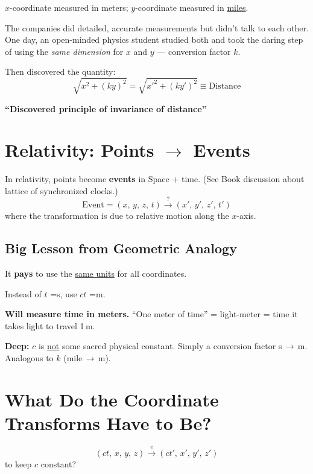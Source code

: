 $x$-coordinate measured in meters; $y$-coordinate measured in \underline{miles}.

\medskip
The companies did detailed, accurate measurements but didn't talk to each other.
One day, an open-minded physics student studied both and took the daring step of
using the \emph{same dimension} for $x$ and $y$ — conversion factor $k$.

Then discovered the quantity:
\[
  \sqrt{x^2 + (ky)^2} = \sqrt{x'^2 + (ky')^2} \equiv \text{Distance}
\]

\textbf{``Discovered principle of invariance of distance''}

\section*{Relativity: Points $\to$ Events}

In relativity, points become \textbf{events} in Space + time.
(See Book discussion about lattice of synchronized clocks.)
\[
  \text{Event} = (x,\,y,\,z,\,t) \xrightarrow{\;?\;} (x',\,y',\,z',\,t')
\]
where the transformation is due to relative motion along the $x$-axis.

\subsection*{Big Lesson from Geometric Analogy}

It \textbf{pays} to use the \underline{same units} for all coordinates.

Instead of $t$ \;[$t$]=s, use $ct$ \;[$ct$]=m.

\textbf{Will measure time in meters.}
``One meter of time'' = light-meter = time it takes light to travel 1\,m.

\begin{tcolorbox}
  \textbf{Deep:} $c$ is \underline{not} some sacred physical constant.
  Simply a conversion factor s\,$\to$\,m.
  Analogous to $k$ (mile\,$\to$\,m).
\end{tcolorbox}

\section*{What Do the Coordinate Transforms Have to Be?}

\[
  (ct,\,x,\,y,\,z) \xrightarrow{\;v\;} (ct',\,x',\,y',\,z')
\]
to keep $c$ constant?

